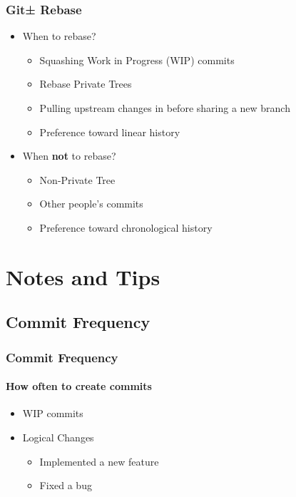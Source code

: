 \documentclass{beamer}
\begin{document}
\begin{frame}
\frametitle{Git± Rebase}
\begin{itemize}
\item{When to rebase?}
\begin{itemize}
\item{Squashing Work in Progress (WIP) commits}
\item{Rebase Private Trees}
\item{Pulling upstream changes in before sharing a new branch}
\item{Preference toward linear history}
\end{itemize}
\item{When \textbf{not} to rebase?}
\begin{itemize}
\item{Non-Private Tree}
\item{Other people's commits}
\item{Preference toward chronological history}
\end{itemize}
\end{itemize}
\end{frame}

\section{Notes and Tips}
\subsection{Commit Frequency}
\begin{frame}
\frametitle{Commit Frequency}
\framesubtitle{How often to create commits}
\begin{itemize}
\item{WIP commits}
\item{Logical Changes}
\begin{itemize}
\item{Implemented a new feature}
\item{Fixed a bug}
\end{itemize}
\end{itemize}
\end{frame}
\end{document}
